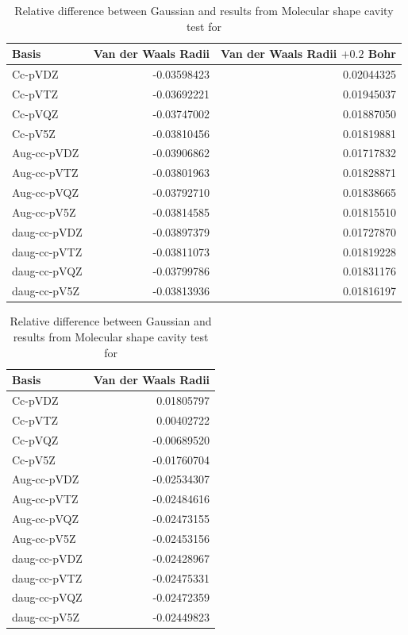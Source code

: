 \documentclass[../master_thesis.tex]{subfiles}
\begin{document}
\begin{table}[htbp]
\caption{Relative difference between Gaussian and \mrchem results from Molecular shape cavity  test for }
\begin{tabular}{l|r|r}
Basis & \multicolumn{1}{l|}{Van der Waals Radii} & \multicolumn{1}{l|}{Van der Waals Radii $+ 0.2$ Bohr} \\ \hline
Cc-pVDZ & -0.03598423 & 0.02044325 \\
Cc-pVTZ & -0.03692221 & 0.01945037 \\
Cc-pVQZ & -0.03747002 & 0.01887050 \\
Cc-pV5Z & -0.03810456 & 0.01819881 \\
Aug-cc-pVDZ & -0.03906862 & 0.01717832 \\
Aug-cc-pVTZ & -0.03801963 & 0.01828871 \\
Aug-cc-pVQZ & -0.03792710 & 0.01838665 \\
Aug-cc-pV5Z & -0.03814585 & 0.01815510 \\
daug-cc-pVDZ & -0.03897379 & 0.01727870 \\
daug-cc-pVTZ & -0.03811073 & 0.01819228 \\
daug-cc-pVQZ & -0.03799786 & 0.01831176 \\
daug-cc-pV5Z & -0.03813936 & 0.01816197 \\
\end{tabular}
\label{tab:nopabcreldiff}
\end{table}


\begin{table}[!htbp]
\caption{Relative difference between Gaussian and \mrchem results from Molecular shape cavity  test for }
\begin{tabular}{l|r}
Basis & \multicolumn{1}{l|}{Van der Waals Radii} \\ \hline
Cc-pVDZ & 0.01805797 \\
Cc-pVTZ & 0.00402722 \\
Cc-pVQZ & -0.00689520 \\
Cc-pV5Z & -0.01760704 \\
Aug-cc-pVDZ & -0.02534307 \\
Aug-cc-pVTZ & -0.02484616 \\
Aug-cc-pVQZ & -0.02473155 \\
Aug-cc-pV5Z & -0.02453156 \\
daug-cc-pVDZ & -0.02428967 \\
daug-cc-pVTZ & -0.02475331 \\
daug-cc-pVQZ & -0.02472359 \\
daug-cc-pV5Z & -0.02449823 \\
\end{tabular}
\label{tab:cyanabcreldiff}
\end{table}
\end{document}
